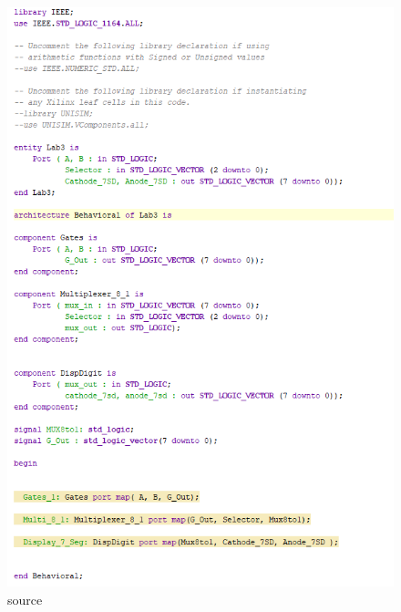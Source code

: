 \documentclass{article}
\begin{document}
\begin{figure}[h]
\begin{center}
\includegraphics[width=1\textwidth]{DecoderSource.png} %
\caption{source}
\end{center}
\end{figure}
\end{document}
